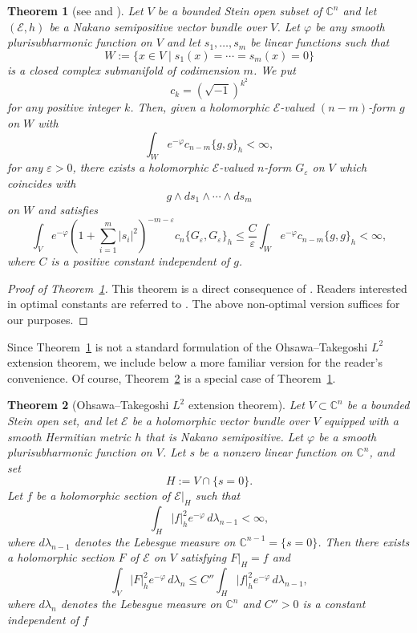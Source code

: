 \documentclass[12pt,twoside]{amsart}
\newtheorem{thm}{Theorem}[section]
\theoremstyle{definition}
\begin{document}
\begin{thm}[{see \cite[Theorem]{ohsawa} and \cite[Corollary~3.13]{guan-zhou}}]
\label{x-thm8.1}
Let $V$ be a bounded Stein open subset of $\mathbb C^n$ and 
let $(\mathcal E, h)$ be a Nakano semipositive vector bundle 
over $V$. 
Let $\varphi$ be any smooth plurisubharmonic function on $V$ and 
let $s_1, \ldots, s_m$ be linear functions such that 
\[
W:=\{x\in V\mid s_1(x)=\cdots =s_m(x)=0\}
\]
is a closed complex submanifold of codimension $m$. 
We put 
\[
c_k=(\sqrt{-1})^{k^2}
\]
for any positive integer $k$. 
Then, given a holomorphic $\mathcal E$-valued $(n-m)$-form $g$ on $W$ with 
\[
\int_W e^{-\varphi} c_{n-m} \{g, g\}_h < \infty, 
\]
for any $\varepsilon > 0$, 
there exists a holomorphic $\mathcal E$-valued $n$-form 
$G_\varepsilon$ on $V$ which coincides with 
\[
g \wedge ds_1 \wedge \cdots \wedge ds_m
\]
on $W$ and satisfies 
\[
\int_V e^{-\varphi} 
\left(1+\sum_{i=1}^m |s_i|^2\right)^{-m-\varepsilon} 
c_n \{G_\varepsilon, G_\varepsilon\}_h 
\leq \frac{C}{\varepsilon} 
\int_W e^{-\varphi} c_{n-m} \{g, g\}_h < \infty, 
\]
where $C$ is a positive constant independent of $g$. 
\end{thm}

\begin{proof}[Proof of Theorem~\ref{x-thm8.1}]
This theorem is a direct consequence of 
\cite[Theorem]{ohsawa}. 
Readers interested in optimal constants are referred to 
\cite[Corollaries~3.13 and~3.14]{guan-zhou}. 
The above non-optimal version suffices for our purposes.
\end{proof}

Since Theorem~\ref{x-thm8.1} is not a standard formulation of the 
Ohsawa--Takegoshi $L^2$ extension theorem, 
we include below a more familiar version for the reader's convenience. 
Of course, Theorem~\ref{x-thm8.2} is a special case of 
Theorem~\ref{x-thm8.1}.

\begin{thm}[Ohsawa--Takegoshi $L^2$ extension theorem]\label{x-thm8.2}
Let $V\subset\mathbb C^n$ be a bounded Stein open set, and let
$\mathcal E$ be a holomorphic vector bundle over $V$
equipped with a smooth Hermitian metric $h$ that is Nakano semipositive.
Let $\varphi$ be a smooth plurisubharmonic function on $V$.
Let $s$ be a nonzero linear function on $\mathbb C^n$, and set
\[
H := V \cap \{s = 0\}.
\]
Let $f$ be a holomorphic section of $\mathcal E|_H$ such that
\[
\int_H |f|_h^2 e^{-\varphi}\, d\lambda_{n-1} < \infty,
\]
where $d\lambda_{n-1}$ denotes the Lebesgue measure on
$\mathbb C^{n-1} = \{s = 0\}$.
Then there exists a holomorphic section $F$ of $\mathcal E$ on $V$
satisfying $F|_H = f$ and
\[
\int_V |F|_h^2 e^{-\varphi}\, d\lambda_n
\le C'' \int_H |f|_h^2 e^{-\varphi}\, d\lambda_{n-1},
\]
where $d\lambda_n$ denotes the Lebesgue measure on $\mathbb C^n$ 
and $C''>0$ is a constant independent of $f$ 
\end{thm}
\end{document}
